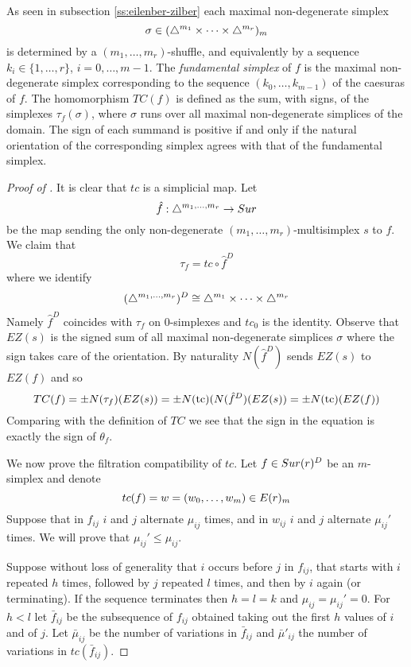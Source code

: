 As seen in subsection \ref{ss:eilenber-zilber}
each maximal non-degenerate simplex  $$\sigma\in (\triangle^{m_1 }\times\dots\times\triangle^{m_r})_m $$ is  determined by a
$(m_1,\dots,m_r)$-shuffle, and equivalently by a sequence $k_i\in \{1,\dots ,r \}$, $i=0,\dots , m-1$.
The \textit{fundamental simplex} of $f$ is the 
maximal non-degenerate simplex corresponding to the  sequence $(k_0,\dots, k_{m-1})$ of the caesuras of $f$.
The homomorphism $TC(f)$ is defined as the sum, with signs, of the simplexes 
$\tau_f(\sigma)$, where $\sigma$ runs
over all maximal non-degenerate simplices of the domain. The sign of each summand is positive if and only if the natural orientation of the corresponding simplex agrees with that of the fundamental simplex.

\begin{proof}[Proof of ]
It is clear that $tc$ is a simplicial map.
Let $$\hat{f}:\triangle^{m_1,\dots,m_r} \to Sur$$ be the map sending the only non-degenerate $(m_1,\dots,m_r)$-multisimplex $s$ to $f$. We claim that $$\tau_f = tc \circ \hat{f}^D$$ where we identify $$(\triangle^{m_1,\dots,m_r})^D \cong \triangle^{m_1}\times\dots\times\triangle^{m_r}$$  %
Namely $\hat{f}^D$ coincides with $\tau_f$ on 0-simplexes and $tc_0$ is the identity.
Observe that $EZ(s)$ is the signed sum of all maximal non-degenerate simplices $\sigma$ where the sign takes care of the orientation.
By naturality $N(\hat{f}^D)$ sends $EZ(s)$ to $EZ(f)$ and
so $$TC(f)= \pm N(\tau_f)(EZ(s))=\pm N(\operatorname{tc})(N(\hat{f}^D)(EZ(s))=\pm N(\operatorname{tc}) (EZ(f))$$ Comparing with the definition of $TC$ we see that 
the sign in the equation is exactly the sign of $\theta_f$.

We now prove the filtration compatibility of $tc$. Let $f\in Sur(r)^{D}$ be an $m$-simplex and denote $$tc(f)=w=(w_{0},\dots,w_{m})\in E(r)_{m}$$ Suppose that in $f_{ij}$ $i$ and $j$ alternate $\mu_{ij}$ times, and in $w_{ij}$ $i$ and $j$ alternate $\mu_{ij}'$ times.
	We will prove that
	$\mu_{ij}' \leq \mu_{ij}$.

	Suppose without loss of generality that $i$ occurs before $j$ in $f_{ij}$, that starts with $i$ repeated $h$ times, followed by $j$ repeated $l$ times, and
	then by $i$ again (or terminating).
	If the sequence terminates then $h=l=k$ and $\mu_{ij}=\mu_{ij}'=0$.
	For $h <l$
	let $\bar{f}_{ij}$ be the subsequence of $f_{ij}$
	obtained taking out the first $h$ values of $i$ and of $j$.
	Let $\bar{\mu}_{ij}$ be the number of variations in $\bar{f}_{ij}$
	and $\bar{\mu}'_{ij}$ the number of variations in $tc(\bar{f}_{ij})$.


\end{proof}
